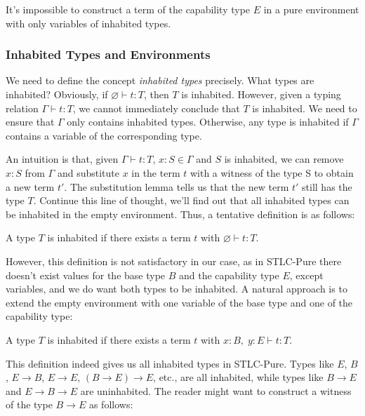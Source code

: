 \begin{definition}
  It's impossible to construct a term of the capability type $E$ in a
  pure environment with only variables of inhabited types.
\end{definition}

\subsubsection{Inhabited Types and Environments}

We need to define the concept \emph{inhabited types} precisely. What
types are inhabited? Obviously, if $\varnothing \vdash t: T$, then $T$
is inhabited.  However, given a typing relation $\Gamma \vdash t: T$,
we cannot immediately conclude that $T$ is inhabited. We need to
ensure that $\Gamma$ only contains inhabited types. Otherwise, any
type is inhabited if $\Gamma$ contains a variable of the corresponding
type.

An intuition is that, given $\Gamma \vdash t: T$, $x:S \in \Gamma$ and
$S$ is inhabited, we can remove $x:S$ from $\Gamma$ and substitute $x$
in the term $t$ with a witness of the type S to obtain a new term
$t'$. The substitution lemma tells us that the new term $t'$ still has
the type $T$. Continue this line of thought, we'll find out that all
inhabited types can be inhabited in the empty environment. Thus, a
tentative definition is as follows:

\begin{definition}
  A type $T$ is inhabited if there exists a term $t$ with
  $\varnothing \vdash t : T$.
\end{definition}

However, this definition is not satisfactory in our case, as in
STLC-Pure there doesn't exist values for the base type $B$ and the
capability type $E$, except variables, and we do want both types to be
inhabited. A natural approach is to extend the empty environment with
one variable of the base type and one of the capability type:

\begin{definition}
  A type $T$ is inhabited if there exists a term $t$ with
  $x:B,\; y:E \vdash t : T$.
\end{definition}

This definition indeed gives us all inhabited types in
STLC-Pure. Types like $E$, $B$, $E \to B$, $E \to E$,
$(B \to E) \to E$, etc., are all inhabited, while types like $B \to E$
and $E \to B \to E$ are uninhabited. The reader might want to
construct a witness of the type $B \to E$ as follows:

